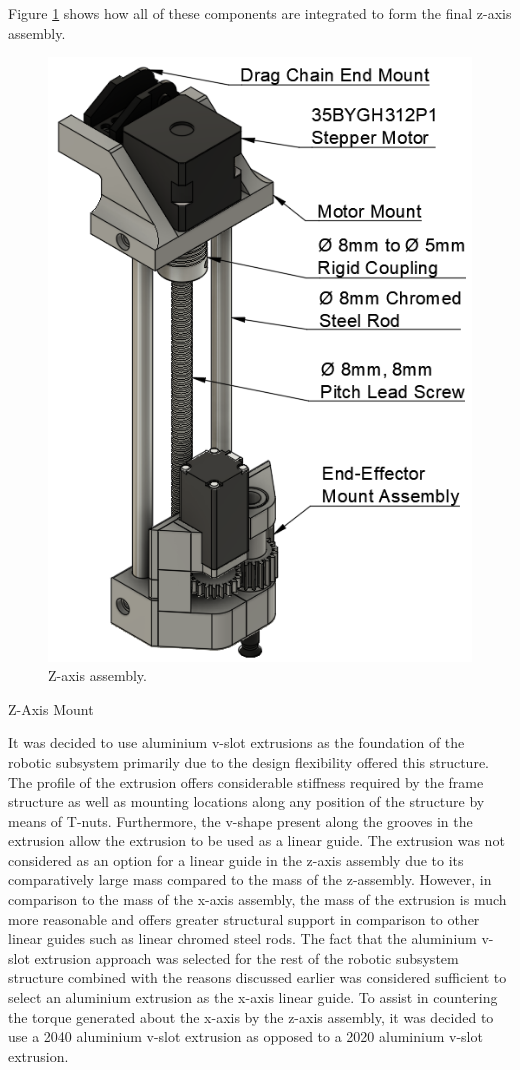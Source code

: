 Figure \ref{fig:z-axis-assembly} shows how all of these components are integrated to form the final z-axis assembly.

\begin{figure}[H]
	\centering
	\includegraphics[width=0.6\linewidth]{figures/z-axis-assembly.png}
	\caption{Z-axis assembly.}
	\label{fig:z-axis-assembly}
\end{figure}

Z-Axis Mount

It was decided to use aluminium v-slot extrusions as the foundation of the robotic subsystem primarily due to the design flexibility offered this structure. The profile of the extrusion offers considerable stiffness required by the frame structure as well as mounting locations along any position of the structure by means of T-nuts. Furthermore, the v-shape present along the grooves in the extrusion allow the extrusion to be used as a linear guide. The extrusion was not considered as an option for a linear guide in the z-axis assembly due to its comparatively large mass compared to the mass of the z-assembly. However, in comparison to the mass of the x-axis assembly, the mass of the extrusion is much more reasonable and offers greater structural support in comparison to other linear guides such as linear chromed steel rods. The fact that the aluminium v-slot extrusion approach was selected for the rest of the robotic subsystem structure combined with the reasons discussed earlier was considered sufficient to select an aluminium extrusion as the x-axis linear guide. To assist in countering the torque generated about the x-axis by the z-axis assembly, it was decided to use a 2040 aluminium v-slot extrusion as opposed to a 2020 aluminium v-slot extrusion.

